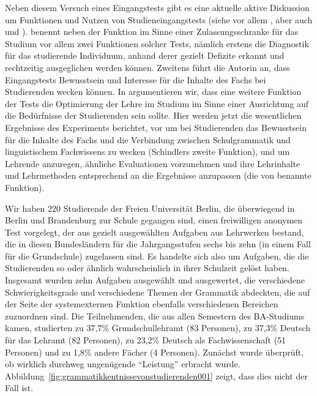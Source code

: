 Neben diesem Versuch eines Eingangstests gibt es eine aktuelle aktive Diskussion um Funktionen und Nutzen von Studieneingangstests (siehe vor allem \citealt{Schindler2016}, aber \zB auch \citealt{Bremerichvos2016} und \citealt{FuhrhopTeuber2016}).
\citet[16]{Schindler2016} benennt neben der Funktion im Sinne einer Zulassungsschranke für das Studium vor allem zwei Funktionen solcher Tests, nämlich erstens die Diagnostik für das studierende Individuum, anhand derer gezielt Defizite erkannt und rechtzeitig ausgeglichen werden können.
Zweitens führt die Autorin an, dass Eingangstests Bewusstsein und Interesse für die Inhalte des Fachs bei Studierenden wecken können.
In \citet[226]{SchaeferSayatz2017a} argumentieren wir, dass eine weitere Funktion der Tests die Optimierung der Lehre im Studium im Sinne einer Ausrichtung auf die Bedürfnisse der Studierenden sein sollte.
Hier werden jetzt die wesentlichen Ergebnisse des Experiments berichtet, vor um bei Studierenden das Bewusstsein für die Inhalte des Fachs und die Verbindung zwischen Schulgrammatik und linguistischem Fachwissens zu wecken (Schindlers zweite Funktion), und um Lehrende anzuregen, ähnliche Evaluationen vorzunehmen und ihre Lehrinhalte und Lehrmethoden entsprechend an die Ergebnisse anzupassen (die von \citealt{SchaeferSayatz2017a} benannte Funktion).

Wir haben 220 Studierende der Freien Universität Berlin, die überwiegend in Berlin und Brandenburg zur Schule gegangen sind, einen freiwilligen anonymen Test vorgelegt, der aus gezielt ausgewählten Aufgaben aus Lehrwerken bestand, die in diesen Bundesländern für die Jahrgangsstufen sechs bis zehn (in einem Fall für die Grundschule) zugelassen sind.
Es handelte sich also um Aufgaben, die die Studierenden so oder ähnlich wahrscheinlich in ihrer Schulzeit gelöst haben.
Insgesamt wurden zehn Aufgaben ausgewählt und ausgewertet, die verschiedene Schwierigkeitsgrade und verschiedene Themen der Grammatik abdeckten, die auf der Seite der systemexternen Funktion ebenfalls verschiedenen Bereichen zuzuordnen sind.
Die Teilnehmenden, die aus allen Semestern des BA-Studiums kamen, studierten zu 37,7\% Grundschullehramt (83 Personen), zu 37,3\% Deutsch für das Lehramt (82 Personen), zu 23,2\% Deutsch als Fachwissenschaft (51 Personen) und zu 1,8\% andere Fächer (4 Personen).
Zunächst wurde überprüft, ob wirklich durchweg ungenügende "`Leistung"' erbracht wurde.
Abbildung~\ref{fig:grammatikkentnissevonstudierenden001} zeigt, dass dies nicht der Fall ist.


